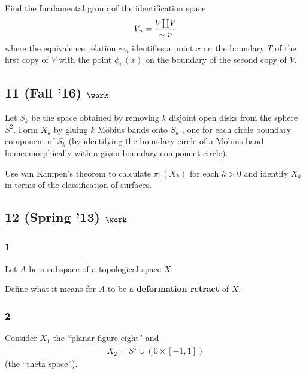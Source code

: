 Find the fundamental group of the identification space
\begin{align*}
V_n = {V{\coprod}V \over \sim n}
\end{align*}
where the equivalence relation \(\sim_n\) identifies a point \(x\) on
the boundary \(T\) of the first copy of \(V\) with the point
\(\phi_n (x)\) on the boundary of the second copy of \(V\).

\hypertarget{fall-16-work-3}{%
\subsection{\texorpdfstring{11 (Fall '16)
\(\work\)}{11 (Fall '16) \textbackslash work}}\label{fall-16-work-3}}

Let \(S_k\) be the space obtained by removing \(k\) disjoint open disks
from the sphere \(S^2\). Form \(X_k\) by gluing \(k\) Möbius bands onto
\(S_k\) , one for each circle boundary component of \(S_k\) (by
identifying the boundary circle of a Möbius band homeomorphically with a
given boundary component circle).

Use van Kampen's theorem to calculate \(\pi_1 (X_k)\) for each \(k > 0\)
and identify \(X_k\) in terms of the classification of surfaces.

\hypertarget{spring-13-work-2}{%
\subsection{\texorpdfstring{12 (Spring '13)
\(\work\)}{12 (Spring '13) \textbackslash work}}\label{spring-13-work-2}}

\hypertarget{section-6}{%
\subsubsection{1}\label{section-6}}

Let \(A\) be a subspace of a topological space \(X\).

Define what it means for \(A\) to be a \textbf{deformation retract} of
\(X\).

\hypertarget{section-7}{%
\subsubsection{2}\label{section-7}}

Consider \(X_1\) the ``planar figure eight'' and
\begin{align*}X_2 = S^1 \cup ({0} \times [-1, 1])\end{align*}
(the ``theta space'').

